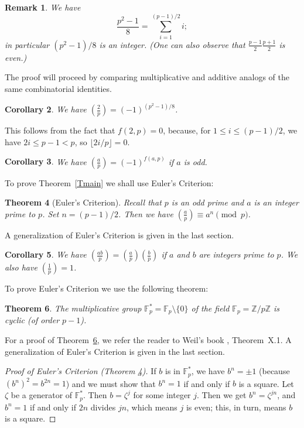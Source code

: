 \documentclass[12pt,letterpaper]{article}
\newcommand{\F}{\mathbb F}
\newcommand{\Z}{\mathbb Z}
\newtheorem{thm}{Theorem}%
\newtheorem{cor}[thm]{Corollary}
\newtheorem{remark}[thm]{Remark}
\begin{document}
\begin{remark} 
We have 
\[
\frac{p^2-1}8=\sum_{i=1}^{(p-1)/2}i;
\] 
in particular \((p^2-1)/8\) is an integer. (One can also observe that \(\frac{p-1}2\frac{p+1}2\) is even.) 
\end{remark} 

The proof will proceed by comparing multiplicative and additive analogs of the same combinatorial identities. 

\begin{cor} 
We have \((\frac2p)=(-1)^{(p^2-1)/8}\). 
\end{cor} 

This follows from the fact that \(f(2,p)=0\), because, for \(1\le i\le(p-1)/2\), we have \(2i\le p-1<p\), so \(\lfloor 2i/p\rfloor=0\). 

\begin{cor}\label{Cfap} 
We have \((\frac ap)=(-1)^{f(a,p)}\) if \(a\) is odd. 
\end{cor} 

To prove Theorem~\ref{Tmain} we shall use Euler's Criterion: 

\begin{thm}[Euler's Criterion]\label{EC} 
Recall that \(p\) is an odd prime and \(a\) is an integer prime to \(p\). Set \(n=(p-1)/2\). Then we have \((\frac ap)\equiv a^n\pmod{p}\).  
\end{thm} 

A generalization of Euler's Criterion is given in the last section. 

\begin{cor}\label{Chom} 
We have \((\frac{ab}p)=(\frac ap)(\frac bp)\) if \(a\) and \(b\) are integers prime to \(p\). We also have \((\frac1p)=1\). 
\end{cor} 

To prove Euler's Criterion we use the following theorem: 

\begin{thm}\label{Tcyc} 
The multiplicative group \(\F_p^*=\F_p\setminus\{0\}\) of the field \(\F_p=\Z/p\Z\) is cyclic (of order \(p-1\)).  
\end{thm}  

For a proof of Theorem~\ref{Tcyc}, we refer the reader to Weil's book \cite{weil1979}, Theorem~X.1. A generalization of Euler's Criterion is given in the last section. 

\begin{proof}[Proof of Euler's Criterion (Theorem \ref{EC})] 
If \(b\) is in \(\F_p^*\), we have \(b^n=\pm1\) (because \((b^n)^2=b^{2n}=1\)) and we must show that \(b^n=1\) if and only if \(b\) is a square. Let \(\zeta\) be a generator of \(\F_p^*\). Then \(b=\zeta^j\) for some integer \(j\). Then we get \(b^n=\zeta^{jn}\), and \(b^n=1\) if and only if \(2n\) divides \(jn\), which means $j$ is even; this, in turn, means $b$ is a square. 
\end{proof} 
\end{document}
